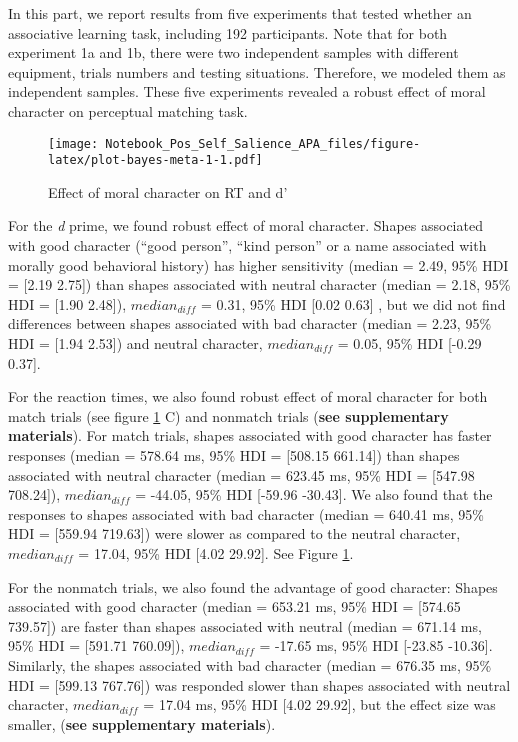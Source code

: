 \documentclass[
  man]{apa6}
\begin{document}
In this part, we report results from five experiments that tested whether an associative learning task, including 192 participants. Note that for both experiment 1a and 1b, there were two independent samples with different equipment, trials numbers and testing situations. Therefore, we modeled them as independent samples. These five experiments revealed a robust effect of moral character on perceptual matching task.

\begin{figure}
\centering
\texttt{[image: Notebook\_Pos\_Self\_Salience\_APA\_files/figure-latex/plot-bayes-meta-1-1.pdf]}
\caption{\label{fig:plot-bayes-meta-1}Effect of moral character on RT and d'}
\end{figure}

For the \emph{d} prime, we found robust effect of moral character. Shapes associated with good character (``good person'', ``kind person'' or a name associated with morally good behavioral history) has higher sensitivity (median = 2.49, 95\% HDI = {[}2.19 2.75{]}) than shapes associated with neutral character (median = 2.18, 95\% HDI = {[}1.90 2.48{]}), \(median_{diff}\) = 0.31, 95\% HDI {[}0.02 0.63{]} , but we did not find differences between shapes associated with bad character (median = 2.23, 95\% HDI = {[}1.94 2.53{]}) and neutral character, \(median_{diff}\) = 0.05, 95\% HDI {[}-0.29 0.37{]}.

For the reaction times, we also found robust effect of moral character for both match trials (see figure \ref{fig:plot-bayes-meta-1} C) and nonmatch trials (\textbf{see supplementary materials}). For match trials, shapes associated with good character has faster responses (median = 578.64 ms, 95\% HDI = {[}508.15 661.14{]}) than shapes associated with neutral character (median = 623.45 ms, 95\% HDI = {[}547.98 708.24{]}), \(median_{diff}\) = -44.05, 95\% HDI {[}-59.96 -30.43{]}. We also found that the responses to shapes associated with bad character (median = 640.41 ms, 95\% HDI = {[}559.94 719.63{]}) were slower as compared to the neutral character, \(median_{diff}\) = 17.04, 95\% HDI {[}4.02 29.92{]}. See Figure \ref{fig:plot-bayes-meta-1}.

For the nonmatch trials, we also found the advantage of good character: Shapes associated with good character (median = 653.21 ms, 95\% HDI = {[}574.65 739.57{]}) are faster than shapes associated with neutral (median = 671.14 ms, 95\% HDI = {[}591.71 760.09{]}), \(median_{diff}\) = -17.65 ms, 95\% HDI {[}-23.85 -10.36{]}. Similarly, the shapes associated with bad character (median = 676.35 ms, 95\% HDI = {[}599.13 767.76{]}) was responded slower than shapes associated with neutral character, \(median_{diff}\) = 17.04 ms, 95\% HDI {[}4.02 29.92{]}, but the effect size was smaller, (\textbf{see supplementary materials}).
\end{document}
